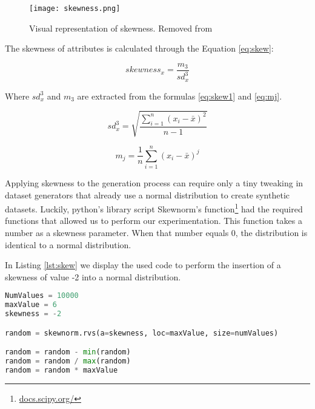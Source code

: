 \begin{figure}[ht]
  \begin{center}
    \leavevmode
    \texttt{[image: skewness.png]}
    \caption[Visual representation of skewness]{Visual representation of skewness. Removed from \cite{doi:10.1080/10691898.2011.11889611}}
    \label{fig:skewness}
  \end{center}
\end{figure}

The skewness of attributes is calculated through the Equation \ref{eq:skew}:

\begin{equation}
  \label{eq:skew}
  skewness_x=\frac{m_3}{sd_x^3}
\end{equation}

Where $sd_x^3$ and $m_3$ are extracted from the formulas \ref{eq:skew1} and \ref{eq:mj}.

\begin{equation}
  \label{eq:skew1}
  sd_x^3=\sqrt{\frac{\sum_{i=1}^{n}(x_i - \bar{x})^2}{n-1}}
\end{equation} 

\begin{equation}
  m_j=\frac{1}{n}\sum_{i=1}^{n}(x_i-\bar{x})^j
  \label{eq:mj}
\end{equation}

Applying skewness to the generation process can require only a tiny tweaking in dataset generators that already use a normal distribution to create synthetic datasets. Luckily, python's library script Skewnorm's function\footnote{\href{https://docs.scipy.org/doc/scipy/reference/generated/scipy.stats.skewnorm.html}{docs.scipy.org/}} had the required functions that allowed us to perform our experimentation. This function takes a number as a skewness parameter. When that number equals 0, the distribution is identical to a normal distribution.

In Listing \ref{lst:skew} we display the used code to perform the insertion of a skewness of value -2 into a normal distribution.

\begin{lstlisting}[language=Python, caption=Integrating skewness, label={lst:skew}]
NumValues = 10000
maxValue = 6
skewness = -2 

random = skewnorm.rvs(a=skewness, loc=maxValue, size=numValues)

random = random - min(random)
random = random / max(random)
random = random * maxValue 
\end{lstlisting}

